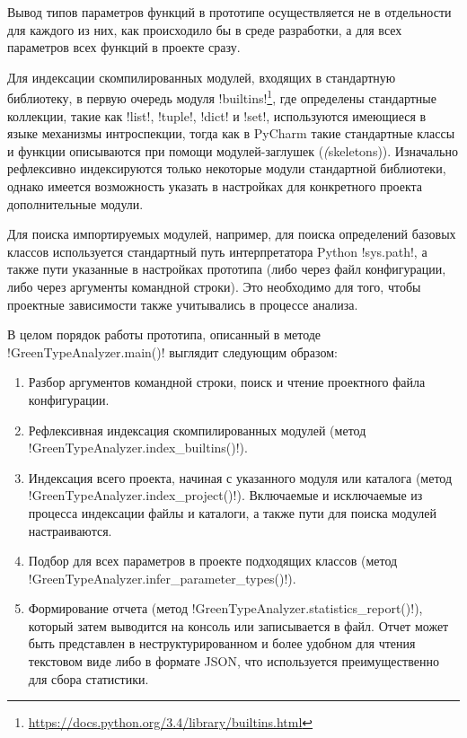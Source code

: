 Вывод типов параметров функций в прототипе осуществляется не в отдельности для
каждого из них, как происходило бы в среде разработки, а для всех параметров
всех функций в проекте сразу.


Для индексации скомпилированных модулей, входящих в стандартную библиотеку, в
первую очередь модуля
!builtins!\footnote{\url{https://docs.python.org/3.4/library/builtins.html}},
где определены стандартные коллекции, такие как !list!, !tuple!, !dict! и !set!,
используются имеющиеся в языке механизмы интроспекции, тогда как в PyCharm
такие стандартные классы и функции описываются при помощи модулей-заглушек
(\emph(skeletons)).
Изначально рефлексивно индексируются только некоторые модули стандартной
библиотеки, однако имеется возможность указать в настройках для конкретного
проекта дополнительные модули.

Для поиска импортируемых модулей, например, для поиска определений базовых
классов используется стандартный путь интерпретатора Python !sys.path!, а также пути
указанные в настройках прототипа (либо через файл конфигурации, либо через
аргументы командной строки). Это необходимо для того, чтобы проектные
зависимости также учитывались в процессе анализа.

В целом порядок работы прототипа, описанный в методе !GreenTypeAnalyzer.main()! 
выглядит следующим образом:

\begin{enumerate}
    \item Разбор аргументов командной строки, поиск и чтение проектного файла
      конфигурации.

    \item Рефлексивная индексация скомпилированных модулей (метод
      !GreenTypeAnalyzer.index_builtins()!).

    \item Индексация всего проекта, начиная с указанного модуля или каталога 
      (метод !GreenTypeAnalyzer.index_project()!).
      Включаемые и исключаемые из процесса индексации файлы и каталоги, а также
      пути для поиска модулей настраиваются. 

    \item Подбор для всех параметров в проекте подходящих классов (метод
      !GreenTypeAnalyzer.infer_parameter_types()!).

    \item Формирование отчета (метод !GreenTypeAnalyzer.statistics_report()!),
      который затем выводится на консоль или записывается в файл. Отчет может
      быть представлен в неструктурированном и более удобном для чтения
      текстовом виде либо в формате JSON, что используется преимущественно для
      сбора статистики. 

\end{enumerate}

